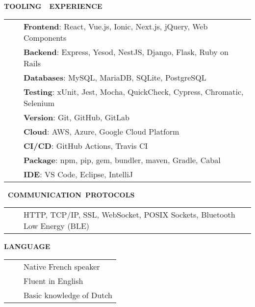 \documentclass[a4paper,11pt,english]{article}
\newcommand{\LeftColumn}[0]{6.0cm}
\newcommand{\ToolCategory}[1]{\textbf{#1}}
\newcommand{\Bullet}[0]{\faCaretRight~~}
\newcommand{\Rubric}[1]{\colorbox{gray!20}{\parbox{\linewidth}{\centering\sffamily\bfseries{}#1}}}
\begin{document}
\begin{minipage}[t]{\LeftColumn}

\Rubric{\faTools \quad TOOLING~~EXPERIENCE}\vspace{8pt}

\begin{tabularx}{\linewidth}{@{}l@{}>{\raggedright\arraybackslash}X@{}}
\Bullet & \ToolCategory{Frontend}: React, Vue.js, Ionic, Next.js, jQuery, Web Components \\[0pt]
\Bullet & \ToolCategory{Backend}: Express, Yesod, NestJS, Django, Flask, Ruby on Rails \\[0pt]
\Bullet & \ToolCategory{Databases}: MySQL, MariaDB, SQLite, PostgreSQL \\[0pt]
\Bullet & \ToolCategory{Testing}: xUnit, Jest, Mocha, QuickCheck, Cypress, Chromatic, Selenium \\[0pt]
\Bullet & \ToolCategory{Version}: Git, GitHub, GitLab \\[0pt]
\Bullet & \ToolCategory{Cloud}: AWS, Azure, Google Cloud Platform \\[0pt]
\Bullet & \ToolCategory{CI/CD}:  GitHub Actions, Travis CI \\[0pt]
\Bullet & \ToolCategory{Package}: npm, pip, gem, bundler, maven, Gradle, Cabal \\[0pt]
\Bullet & \ToolCategory{IDE}: VS Code, Eclipse, IntelliJ \\[0pt]
\end{tabularx}

\vspace{12pt}\Rubric{\faNetworkWired~COMMUNICATION~PROTOCOLS}\vspace{8pt}

\begin{tabularx}{\linewidth}{@{}l@{}>{\raggedright\arraybackslash}X@{}}
\Bullet & HTTP, TCP/IP, SSL, WebSocket, POSIX Sockets, Bluetooth Low Energy (BLE) \\[0pt]
\end{tabularx}

\vspace{12pt}\Rubric{\faLanguage \quad LANGUAGE}\vspace{8pt}

\begin{tabularx}{\linewidth}{@{}l@{}l@{}}
\Bullet & Native French speaker \\[0pt]
\Bullet & Fluent in English \\[0pt]
\Bullet & Basic knowledge of Dutch \\[0pt]
\end{tabularx}


\end{minipage}
\end{document}
